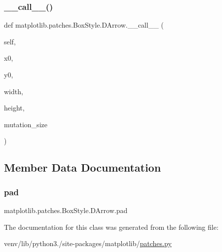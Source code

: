 \subsubsection{\texorpdfstring{\+\_\+\+\_\+call\+\_\+\+\_\+()}{\_\_call\_\_()}}
{\footnotesize\ttfamily def matplotlib.\+patches.\+Box\+Style.\+D\+Arrow.\+\_\+\+\_\+call\+\_\+\+\_\+ (\begin{DoxyParamCaption}\item[{}]{self,  }\item[{}]{x0,  }\item[{}]{y0,  }\item[{}]{width,  }\item[{}]{height,  }\item[{}]{mutation\+\_\+size }\end{DoxyParamCaption})}



\subsection{Member Data Documentation}
\mbox{\label{classmatplotlib_1_1patches_1_1BoxStyle_1_1DArrow_a3e3e34e71c2119467e24d32238673366}} 
\subsubsection{\texorpdfstring{pad}{pad}}
{\footnotesize\ttfamily matplotlib.\+patches.\+Box\+Style.\+D\+Arrow.\+pad}



The documentation for this class was generated from the following file\+:\begin{DoxyCompactItemize}
\item 
venv/lib/python3./site-\/packages/matplotlib/\hyperlink{patches_8py}{patches.\+py}\end{DoxyCompactItemize}
